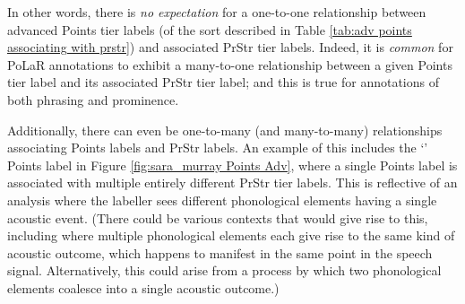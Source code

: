\documentclass[11pt, twoside]{memoir}
\def\polar#1{{\relsize{-.5}\fontspec[Mapping=tex-text]{Roboto Mono}{#1}}}
\def\polarquot#1{‘\polar{#1}’}
\begin{document}
In other words, there is \textit{no expectation} for a one-to-one relationship between advanced Points tier labels (of the sort described in Table \ref{tab:adv points associating with prstr}) and associated PrStr tier labels. Indeed, it is \textit{common} for PoLaR annotations to exhibit a {many-to-one} relationship between a given Points tier label and its associated PrStr tier label; and this is true for annotations of both phrasing and prominence.

Additionally, there can even be one-to-many ({and many-to-many}) relationships associating Points labels and PrStr labels. An example of this includes the \polarquot{*</*>} Points label in Figure \ref{fig:sara_murray Points Adv}, where a single Points label is associated with multiple entirely different PrStr tier labels. This is reflective of an analysis where the labeller sees different phonological elements having a single acoustic event. (There could be various contexts that would give rise to this, including where multiple phonological elements each give rise to the same kind of acoustic outcome, which happens to manifest in the same point in the speech signal. Alternatively, this could arise from a process by which two phonological elements coalesce into a single acoustic outcome.)
\end{document}
